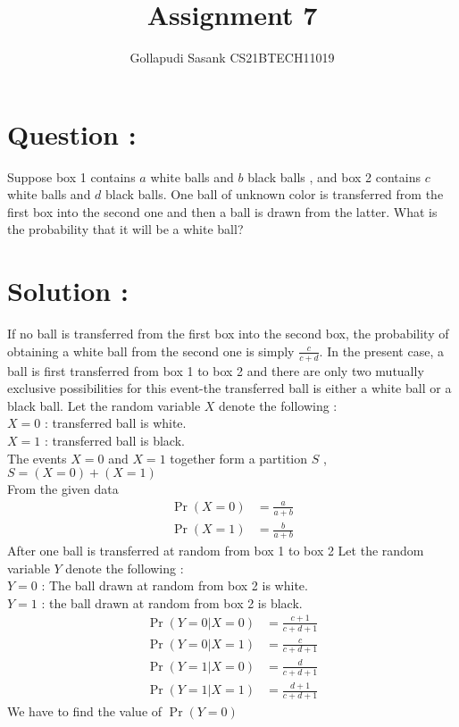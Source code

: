 \documentclass[journal,twocolumn]{IEEEtran}
\title{Assignment 7}
\author{Gollapudi Sasank CS21BTECH11019}
\providecommand{\pr}[1]{\ensuremath{\Pr\left(#1\right)}}
\begin{document}
\maketitle
\section*{Question : }
Suppose box 1 contains $a$ white balls and $b$ black balls , and box 2 contains $c$ white balls and $d$ black balls.  One ball of unknown color is transferred from the first box into the second one and then a ball is drawn from the latter. What is the probability that it will be a white ball? 
\section*{Solution : }
If no ball is transferred from the first box into the second box, the probability of obtaining a white ball from the second one is simply $\frac{c}{c + d}$. In the present case, a ball is first transferred from box 1 to box 2 and there are only two mutually exclusive possibilities  for this event-the transferred ball is either a white ball or a black ball. Let the random variable $X$ denote the following : \\
$X = 0$ : transferred ball is white. \\
$X = 1$ : transferred ball is black. \\
The events $X=0$ and $X=1$ together form a partition $S$ , $S = (X=0) + (X=1)$ \\
From the given data 
\begin{align}
    \pr{X=0} &= \frac{a}{a+b} \\
    \pr{X=1} &= \frac{b}{a+b} 
\end{align}
After one ball is transferred at random from box 1 to box 2 Let the random variable $Y$ denote the following : \\
$Y = 0$ : The ball drawn at random from box 2 is white. \\
$Y = 1$ : the ball drawn at random from box 2 is black. \\
\begin{align}
    \pr{Y=0|X=0} &= \frac{c+1}{c+d+1} \\
    \pr{Y=0|X=1} &= \frac{c}{c+d+1} \\
    \pr{Y=1|X=0} &= \frac{d}{c+d+1} \\
    \pr{Y=1|X=1} &= \frac{d+1}{c+d+1} 
\end{align}
We have to find the value of $\pr{Y=0}$ \\
\end{document}
